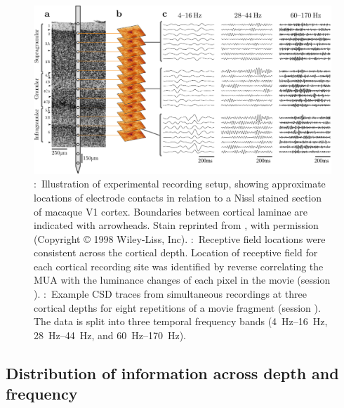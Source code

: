 \begin{figure}[htbp]
\subfloat{\label{fig:lam_1a}}
\subfloat{\label{fig:lam_1b}}
\subfloat{\label{fig:lam_1c}}
\centerline{
\includegraphics[width=\linewidth]{paperfigs/fig1.pdf}
}
%
\caption{
\protect{}:~Illustration of experimental recording setup, showing approximate locations of electrode contacts in relation to a Nissl stained section of macaque \ac{V1} cortex.
Boundaries between cortical laminae are indicated with arrowheads.
Stain reprinted from \citet{Tyler1998}, with permission (Copyright \copyright{} 1998 Wiley-Liss, Inc).
\protect{}:~Receptive field locations were consistent across the cortical depth.
Location of receptive field for each cortical recording site was identified by reverse correlating the \ac{MUA} with the luminance changes of each pixel in the movie (session ).
\protect{}:~Example \ac{CSD} traces from simultaneous recordings at three cortical depths for eight repetitions of a movie fragment (session ).
The data is split into three temporal frequency bands (\SIrange{4}{16}{Hz}, \SIrange{28}{44}{Hz}, and \SIrange{60}{170}{Hz}).
}%
\label{fig:lam_1}
%
\end{figure}


\subsection{Distribution of information across depth and frequency}

